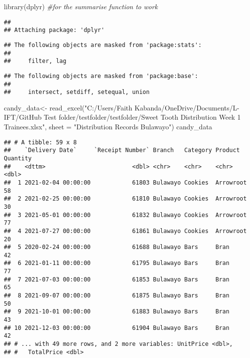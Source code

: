 \documentclass[
]{article}
\newenvironment{Shaded}{\begin{snugshade}}{\end{snugshade}}
\newcommand{\AttributeTok}[1]{\textcolor[rgb]{0.77,0.63,0.00}{#1}}
\newcommand{\CommentTok}[1]{\textcolor[rgb]{0.56,0.35,0.01}{\textit{#1}}}
\newcommand{\FunctionTok}[1]{\textcolor[rgb]{0.00,0.00,0.00}{#1}}
\newcommand{\NormalTok}[1]{#1}
\newcommand{\OtherTok}[1]{\textcolor[rgb]{0.56,0.35,0.01}{#1}}
\newcommand{\StringTok}[1]{\textcolor[rgb]{0.31,0.60,0.02}{#1}}
\begin{document}
\begin{Shaded}
\begin{Highlighting}[]
\FunctionTok{library}\NormalTok{(dplyr) }\CommentTok{\#for the summarise function to work}
\end{Highlighting}
\end{Shaded}

\begin{verbatim}
## 
## Attaching package: 'dplyr'
\end{verbatim}

\begin{verbatim}
## The following objects are masked from 'package:stats':
## 
##     filter, lag
\end{verbatim}

\begin{verbatim}
## The following objects are masked from 'package:base':
## 
##     intersect, setdiff, setequal, union
\end{verbatim}

\begin{Shaded}
\begin{Highlighting}[]
\NormalTok{candy\_data}\OtherTok{\textless{}{-}} \FunctionTok{read\_excel}\NormalTok{(}\StringTok{"C:/Users/Faith Kabanda/OneDrive/Documents/L{-}IFT/GitHub Test folder/testfolder/testfolder/Sweet Tooth Distribution Week 1 Trainees.xlsx"}\NormalTok{, }
    \AttributeTok{sheet =} \StringTok{"Distribution Records Bulawayo"}\NormalTok{)}
\NormalTok{candy\_data}
\end{Highlighting}
\end{Shaded}

\begin{verbatim}
## # A tibble: 59 x 8
##    `Delivery Date`     `Receipt Number` Branch   Category Product   Quantity
##    <dttm>                         <dbl> <chr>    <chr>    <chr>        <dbl>
##  1 2021-02-04 00:00:00            61803 Bulawayo Cookies  Arrowroot       58
##  2 2021-02-25 00:00:00            61810 Bulawayo Cookies  Arrowroot       30
##  3 2021-05-01 00:00:00            61832 Bulawayo Cookies  Arrowroot       77
##  4 2021-07-27 00:00:00            61861 Bulawayo Cookies  Arrowroot       20
##  5 2020-02-24 00:00:00            61688 Bulawayo Bars     Bran            42
##  6 2021-01-11 00:00:00            61795 Bulawayo Bars     Bran            77
##  7 2021-07-03 00:00:00            61853 Bulawayo Bars     Bran            65
##  8 2021-09-07 00:00:00            61875 Bulawayo Bars     Bran            50
##  9 2021-10-01 00:00:00            61883 Bulawayo Bars     Bran            43
## 10 2021-12-03 00:00:00            61904 Bulawayo Bars     Bran            42
## # ... with 49 more rows, and 2 more variables: UnitPrice <dbl>,
## #   TotalPrice <dbl>
\end{verbatim}
\end{document}
